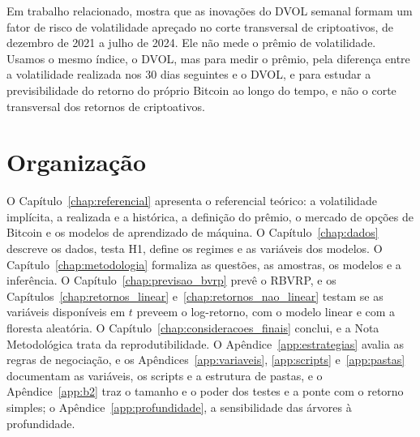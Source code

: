 Em trabalho relacionado, \citet{han2026price} mostra que as inovações do DVOL
semanal formam um fator de risco de volatilidade apreçado no corte transversal
de criptoativos, de dezembro de 2021 a julho de 2024. Ele não mede o prêmio de
volatilidade. Usamos o mesmo índice, o DVOL, mas para medir o
prêmio, pela diferença entre a volatilidade realizada nos 30 dias seguintes e o
DVOL, e para estudar a previsibilidade do retorno do próprio Bitcoin ao longo
do tempo, e não o corte transversal dos retornos de criptoativos.

\section*{Organização}
\label{sec:intro-organizacao}

O Capítulo~\ref{chap:referencial} apresenta o referencial teórico: a
volatilidade implícita, a realizada e a histórica, a definição do prêmio, o mercado de
opções de Bitcoin e os modelos de aprendizado de máquina. O
Capítulo~\ref{chap:dados} descreve os dados, testa H1, define os regimes e as variáveis dos modelos. O
Capítulo~\ref{chap:metodologia} formaliza as questões, as amostras, os modelos
e a inferência. O Capítulo~\ref{chap:previsao_bvrp} prevê o RBVRP, e os
Capítulos~\ref{chap:retornos_linear} e~\ref{chap:retornos_nao_linear} testam se
as variáveis disponíveis em $t$ preveem o log-retorno, com o modelo linear e
com a floresta aleatória. O Capítulo~\ref{chap:consideracoes_finais} conclui, e a Nota
Metodológica trata da reprodutibilidade. O Apêndice~\ref{app:estrategias}
avalia as regras de negociação, e os Apêndices~\ref{app:variaveis},
\ref{app:scripts} e~\ref{app:pastas} documentam as variáveis, os scripts e a
estrutura de pastas, e o Apêndice~\ref{app:b2} traz o tamanho e o poder dos
testes e a ponte com o retorno simples; o Apêndice~\ref{app:profundidade}, a
sensibilidade das árvores à profundidade.
